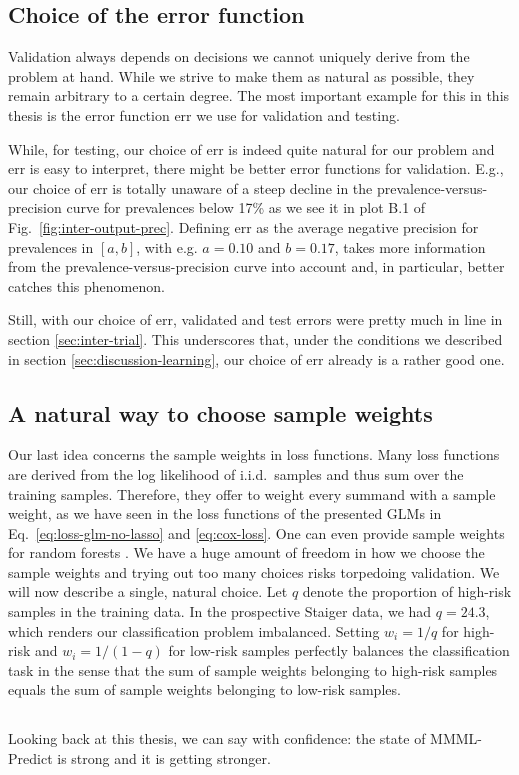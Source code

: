 \subsection{Choice of the error function}

Validation always depends on decisions we cannot uniquely derive from the problem at hand. 
While we strive to make them as natural as possible, they remain arbitrary to a certain degree. 
The most important example for this in this thesis is the error function $\text{err}$ we use for 
validation and testing.

While, for testing, our choice of $\text{err}$ is indeed quite natural for our problem and 
$\text{err}$ is easy to interpret, there might be better error functions for validation. E.g., our 
choice of $\text{err}$ is totally unaware of a steep decline in the prevalence-versus-precision 
curve for prevalences below \num{17}\% as we see it in plot B.1 of Fig.\ \ref{fig:inter-output-prec}. 
Defining $\text{err}$ as the average negative precision for prevalences in $[a, b]$, with e.g. 
$a = \num{0.10}$ and $b = \num{0.17}$, takes more information from the prevalence-versus-precision 
curve into account and, in particular, better catches this phenomenon.

Still, with our choice of $\text{err}$, validated and test errors were pretty much in line in 
section \ref{sec:inter-trial}. This underscores that, under the conditions we described in 
section \ref{sec:discussion-learning}, our choice of $\text{err}$ already is a rather good one.

\subsection{A natural way to choose sample weights}

Our last idea concerns the sample weights in loss functions. Many loss functions are derived 
from the log likelihood of i.i.d.\ samples and thus sum over the training samples. Therefore, they 
offer to weight every summand with a sample weight, as we have seen in the loss functions of the 
presented GLMs in Eq.\ \eqref{eq:loss-glm-no-lasso} and \eqref{eq:cox-loss}. One can even provide 
sample weights for random forests \cite{ranger17}. We have a huge amount of 
freedom in how we choose the sample weights and trying out too many choices risks torpedoing 
validation. We will now describe a single, natural choice. Let $q$ denote the 
proportion of high-risk samples in the training data. In the prospective Staiger data, we had 
$q = \num{24.3}$, which renders our classification problem imbalanced. Setting $w_i = 1/q$ for 
high-risk and $w_i = 1/(1-q)$ for low-risk samples perfectly balances the classification task in 
the sense that the sum of sample weights belonging to high-risk samples equals the sum of sample 
weights belonging to low-risk samples.

\subsection*{}
Looking back at this thesis, we can say with confidence: the state of MMML-Predict is strong and 
it is getting stronger.